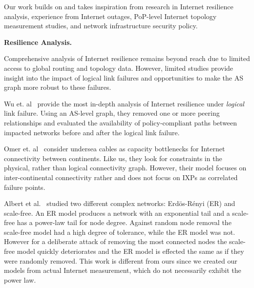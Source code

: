 Our work builds on and takes inspiration from research in Internet resilience
analysis, experience from Internet outages, PoP-level Internet topology
measurement studies, and network infrastructure security policy.

{\bf Resilience Analysis.}

    Comprehensive analysis of Internet resilience remains beyond reach due to
    limited access to global routing and topology data.  However, limited
    studies provide insight into the impact of logical link failures and
    opportunities to make the AS graph more robust to these failures.
    
    Wu et. al~\cite{michigan} provide the most in-depth analysis of Internet
    resilience under {\it logical} link failure.  Using an AS-level graph, they
    removed one or more peering relationships and evaluated the availability of
    policy-compliant paths between impacted networks before and after the
    logical link failure.

    Omer et. al~\cite{measuringresilience} consider undersea cables as capacity
    bottlenecks for Internet connectivity between continents.  Like us, they
    look for constraints in the physical, rather than logical connectivity
    graph.  However, their model focuses on inter-continental connectivity
    rather and does not focus on IXPs as correlated failure points.

     Albert
    et al.~\cite{resilience-complex-networks} studied two different complex
    networks: Erd\"{o}s-R\'{e}nyi (ER) and scale-free. An ER model produces a
    network with an exponential tail and a scale-free has a power-law tail for
    node degree. Against random node removal the scale-free model had a high
    degree of tolerance, while the ER model was not. However for a deliberate
    attack of removing the most connected nodes the scale-free model quickly
    deteriorates and the ER model is effected the same as if they were
    randomly removed. This work is different from ours since we created our
    models from actual Internet measurement, which do not necessarily exhibit
    the power law.

